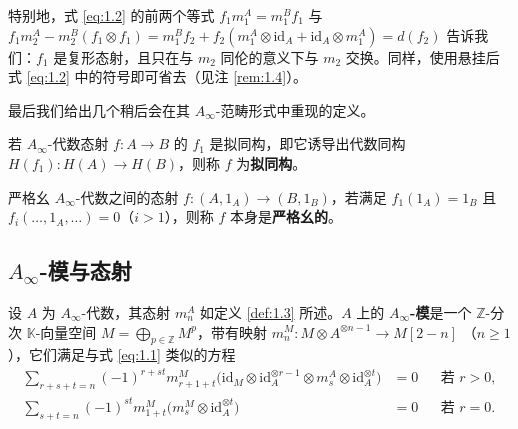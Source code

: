 
特别地，式 \eqref{eq:1.2} 的前两个等式
$f_1m_1^A=m_1^Bf_1$ 与
$f_1m_2^A-m_2^B(f_1\otimes f_1)
=m_1^Bf_2+f_2(m_1^A\otimes\mathrm{id}_A+\mathrm{id}_A\otimes m_1^A)=d(f_2)$
告诉我们：$f_1$ 是复形态射，且只在与 $m_2$ 同伦的意义下与 $m_2$ 交换。同样，使用悬挂后
式 \eqref{eq:1.2} 中的符号即可省去（见注 \ref{rem:1.4}）。

最后我们给出几个稍后会在其 $A_\infty$-范畴形式中重现的定义。

\begin{Def}\label{def:1.7}
若 $A_\infty$-代数态射 $f:A\to B$ 的 $f_1$ 是拟同构，即它诱导出代数同构
$H(f_1):H(A)\to H(B)$，则称 $f$ 为\textbf{拟同构}。

严格幺 $A_\infty$-代数之间的态射 $f:(A,1_A)\to(B,1_B)$，若满足 $f_1(1_A)=1_B$ 且
$f_i(\dots,1_A,\dots)=0$（$i>1$），则称 $f$ 本身是\textbf{严格幺的}。
\end{Def}

\subsection{$A_\infty$-模与态射}\label{sec:1.3}

\begin{Def}\label{def:1.8}
设 $A$ 为 $A_\infty$-代数，其态射 $m_n^A$ 如定义 \ref{def:1.3} 所述。$A$ 上的
\textbf{$A_\infty$-模}是一个 $\mathbb Z$-分次 $\mathbb K$-向量空间
$M=\bigoplus_{p\in\mathbb Z}M^p$，带有映射 $m_n^M:M\otimes A^{\otimes n-1}\to M[2-n]$
（$n\ge 1$），它们满足与式 \eqref{eq:1.1} 类似的方程
\begin{equation}\label{eq:1.3}
  \begin{aligned}
    \sum_{r+s+t=n}(-1)^{r+st}m_{r+1+t}^M
    \bigl(\mathrm{id}_M\otimes\mathrm{id}_A^{\otimes r-1}\otimes m_s^A
    \otimes\mathrm{id}_A^{\otimes t}\bigr)&=0
    &&\text{若 } r>0,\\
    \sum_{s+t=n}(-1)^{st}m_{1+t}^M\bigl(m_s^M\otimes\mathrm{id}_A^{\otimes t}\bigr)&=0
    &&\text{若 } r=0.
  \end{aligned}
\end{equation}
\end{Def}


